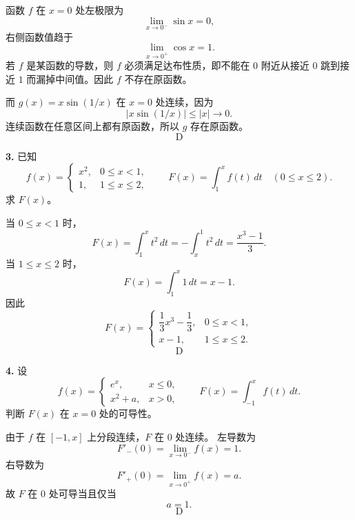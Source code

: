 \begin{solutionblock}
函数 \(f\) 在 \(x=0\) 处左极限为
\[
\lim_{x\to0^-}\sin x=0,
\]
右侧函数值趋于
\[
\lim_{x\to0^+}\cos x=1.
\]
若 \(f\) 是某函数的导数，则 \(f\) 必须满足达布性质，即不能在 \(0\) 附近从接近 \(0\) 跳到接近 \(1\) 而漏掉中间值。因此 \(f\) 不存在原函数。

而 \(g(x)=x\sin(1/x)\) 在 \(x=0\) 处连续，因为
\[
|x\sin(1/x)|\le |x|\to0.
\]
连续函数在任意区间上都有原函数，所以 \(g\) 存在原函数。
\[
\boxed{\text{D}}
\]
\end{solutionblock}

\begin{problemblock}
\textbf{3.} 已知
\[
f(x)=
\begin{cases}
x^2,&0\le x<1,\\
1,&1\le x\le2,
\end{cases}
\qquad
F(x)=\int_1^x f(t)\,dt\quad(0\le x\le2).
\]
求 \(F(x)\)。
\end{problemblock}

\begin{solutionblock}
当 \(0\le x<1\) 时，
\[
F(x)=\int_1^x t^2\,dt=-\int_x^1t^2\,dt
=\frac{x^3-1}{3}.
\]
当 \(1\le x\le2\) 时，
\[
F(x)=\int_1^x1\,dt=x-1.
\]
因此
\[
F(x)=
\begin{cases}
\dfrac13x^3-\dfrac13,&0\le x<1,\\
x-1,&1\le x\le2.
\end{cases}
\]
\[
\boxed{\text{D}}
\]
\end{solutionblock}

\begin{problemblock}
\textbf{4.} 设
\[
f(x)=
\begin{cases}
e^x,&x\le0,\\
x^2+a,&x>0,
\end{cases}
\qquad
F(x)=\int_{-1}^x f(t)\,dt.
\]
判断 \(F(x)\) 在 \(x=0\) 处的可导性。
\end{problemblock}

\begin{solutionblock}
由于 \(f\) 在 \([-1,x]\) 上分段连续，\(F\) 在 \(0\) 处连续。
左导数为
\[
F'_-(0)=\lim_{x\to0^-}f(x)=1.
\]
右导数为
\[
F'_+(0)=\lim_{x\to0^+}f(x)=a.
\]
故 \(F\) 在 \(0\) 处可导当且仅当
\[
a=1.
\]
\[
\boxed{\text{D}}
\]
\end{solutionblock}

